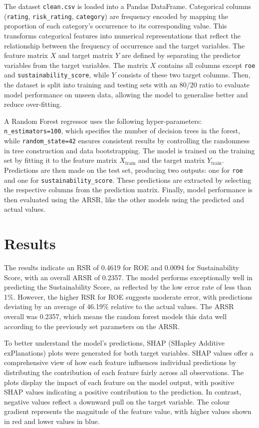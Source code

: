 The dataset \texttt{clean.csv} is loaded into a Pandas DataFrame. Categorical columns (\texttt{rating}, \texttt{risk\_rating}, \texttt{category}) are frequency encoded by mapping the proportion of each category's occurrence to its corresponding value. This transforms categorical features into numerical representations that reflect the relationship between the frequency of occurrence and the target variables. The feature matrix \( X \) and target matrix \( Y \) are defined by separating the predictor variables from the target variables. The matrix \( X \) contains all columns except \texttt{roe} and \texttt{sustainability\_score}, while \( Y \) consists of these two target columns. Then, the dataset is split into training and testing sets with an 80/20 ratio to evaluate model performance on unseen data, allowing the model to generalise better and reduce over-fitting.

A Random Forest regressor uses the following hyper-parameters: \texttt{n\_estimators=100}, which specifies the number of decision trees in the forest, while \texttt{random\_state=42} ensures consistent results by controlling the randomness in tree construction and data bootstrapping. The model is trained on the training set by fitting it to the feature matrix \( X_{\text{train}} \) and the target matrix \( Y_{\text{train}} \). Predictions are then made on the test set, producing two outputs: one for \texttt{roe} and one for \texttt{sustainability\_score}. These predictions are extracted by selecting the respective columns from the prediction matrix. Finally, model performance is then evaluated using the ARSR, like the other models using the predicted and actual values.


\section{Results}
The results indicate an RSR of 0.4619 for ROE and 0.0094 for Sustainability Score, with an overall ARSR of 0.2357. The model performs exceptionally well in predicting the Sustainability Score, as reflected by the low error rate of less than 1\%. However, the higher RSR for ROE suggests moderate error, with predictions deviating by an average of 46.19\% relative to the actual values.  
The ARSR overall was 0.2357, which means the random forest models this data well according to the previously set parameters on the ARSR.

To better understand the model's predictions, SHAP (SHapley Additive exPlanations) plots were generated for both target variables. SHAP values offer a comprehensive view of how each feature influences individual predictions by distributing the contribution of each feature fairly across all observations. The plots display the impact of each feature on the model output, with positive SHAP values indicating a positive contribution to the prediction. In contrast, negative values reflect a downward pull on the target variable. The colour gradient represents the magnitude of the feature value, with higher values shown in red and lower values in blue.

